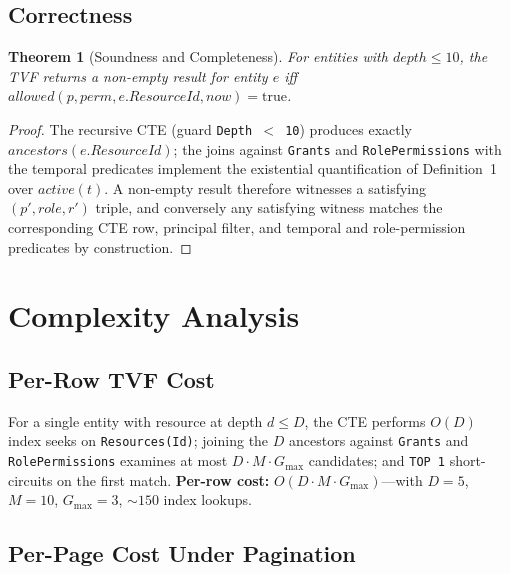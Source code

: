 \documentclass[conference]{IEEEtran}
\newtheorem{theorem}{Theorem}
\begin{document}
\subsection{Correctness}

\begin{theorem}[Soundness and Completeness]
For entities with $\mathit{depth} \leq 10$, the TVF returns a non-empty result for entity $e$ iff $\mathit{allowed}(p, \mathit{perm}, e.\mathit{ResourceId}, \mathit{now}) = \text{true}$.
\end{theorem}
\begin{proof}
The recursive CTE (guard \texttt{Depth~$<$~10}) produces exactly $\mathit{ancestors}(e.\mathit{ResourceId})$; the joins against \texttt{Grants} and \texttt{RolePermissions} with the temporal predicates implement the existential quantification of Definition~1 over $\mathit{active}(t)$. A non-empty result therefore witnesses a satisfying $(p', \mathit{role}, r')$ triple, and conversely any satisfying witness matches the corresponding CTE row, principal filter, and temporal and role-permission predicates by construction.
\end{proof}

\section{Complexity Analysis}
\label{sec:complexity}

\subsection{Per-Row TVF Cost}

For a single entity with resource at depth $d \leq D$, the CTE performs $O(D)$ index seeks on \texttt{Resources(Id)}; joining the $D$ ancestors against \texttt{Grants} and \texttt{RolePermissions} examines at most $D \cdot M \cdot G_{\max}$ candidates; and \texttt{TOP 1} short-circuits on the first match. \textbf{Per-row cost:} $O(D \cdot M \cdot G_{\max})$---with $D = 5$, $M = 10$, $G_{\max} = 3$, ${\sim}150$ index lookups.

\subsection{Per-Page Cost Under Pagination}
\end{document}
